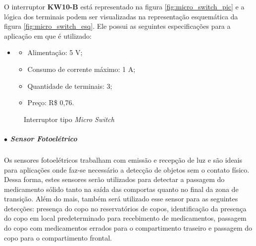     
    O interruptor \textbf{KW10-B} está representado na figura \ref{fig:micro_switch_pic} e a lógica dos terminais podem ser visualizadas na representação esquemática da figura \ref{fig:micro_switch_esq}. Ele possui as seguintes especificações para a aplicação em que é utilizado:
    
   \begin{itemize}
    \item[ ]
        \begin{itemize}
            \item Alimentação: 5 V;
            \item Consumo de corrente máximo: 1 A;
            \item Quantidade de terminais: 3;
            \item Preço: R\$ 0,76.
        \end{itemize}
    \end{itemize}
    
    \begin{figure}[H]
        \centering
        \hspace{0.1\textwidth}
        \caption{Interruptor tipo \textit{Micro Switch}}\label{fig:micro_switch}
    \end{figure}
    
    \subparagraph*{$\bullet$ Sensor Fotoelétrico} \hfill
    
    Os sensores fotoelétricos trabalham com emissão e recepção de luz e são ideais para aplicações onde faz-se necessário a detecção de objetos sem o contato físico. Dessa forma, estes sensores serão utilizados para detectar a passagem do medicamento sólido tanto na saída das comportas quanto no final da zona de transição. Além do mais, também será utilizado esse sensor para as seguintes detecções: presença do copo no reservatórios de copos, identificação da presença do copo em local predeterminado para recebimento de medicamentos, passagem do copo com medicamentos errados para o compartimento traseiro e passagem do copo para o compartimento frontal.
    
